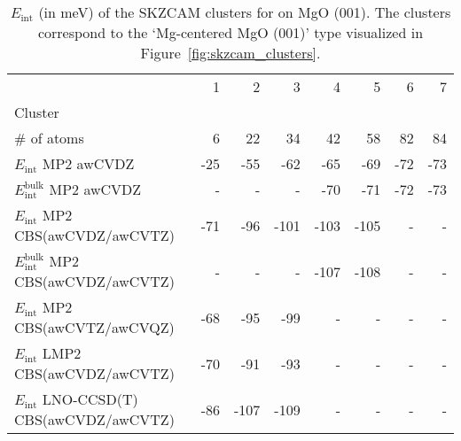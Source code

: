 
\begin{table}
\caption{\label{tab:system_eint_mgo_ch4}$E_\textrm{int}$ (in meV) of the SKZCAM clusters for  on MgO (001). The clusters correspond to the `Mg-centered MgO (001)' type visualized in Figure~\ref{fig:skzcam_clusters}.}
\begin{adjustbox}{center,max width=1.4\textwidth}
\begin{tabular}{lrrrrrrr}
\toprule
 & 1 & 2 & 3 & 4 & 5 & 6 & 7 \\ 
Cluster &  &  &  &  &  &  &  \\
\midrule
\# of atoms & 6 & 22 & 34 & 42 & 58 & 82 & 84 \\
$E_\textrm{int}$ MP2 awCVDZ & -25 & -55 & -62 & -65 & -69 & -72 & -73 \\
$E_\textrm{int}^\textrm{bulk}$ MP2 awCVDZ & - & - & - & -70 & -71 & -72 & -73 \\
$E_\textrm{int}$ MP2 CBS(awCVDZ/awCVTZ) & -71 & -96 & -101 & -103 & -105 & - & - \\
$E_\textrm{int}^\textrm{bulk}$ MP2 CBS(awCVDZ/awCVTZ) & - & - & - & -107 & -108 & - & - \\
$E_\textrm{int}$ MP2 CBS(awCVTZ/awCVQZ) & -68 & -95 & -99 & - & - & - & - \\
$E_\textrm{int}$ LMP2 CBS(awCVDZ/awCVTZ) & -70 & -91 & -93 & - & - & - & - \\
$E_\textrm{int}$ LNO-CCSD(T) CBS(awCVDZ/awCVTZ) & -86 & -107 & -109 & - & - & - & - \\
\bottomrule
\end{tabular}
\end{adjustbox}
\end{table}

